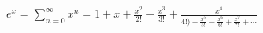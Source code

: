 \documentclass[preview]{standalone}
\begin{document}
\begin{align*}
e^x =\sum_{n=0}^{\infty} x^n = 1+x+\frac{x^2}{2!}+\frac{x^3}{3!}+\frac{x^4}{4!)+ \frac{x^5}{5!}+\frac{x^6}{6!}+\frac{x^7}{7!}+\cdots}
\end{align*}
\end{document}
